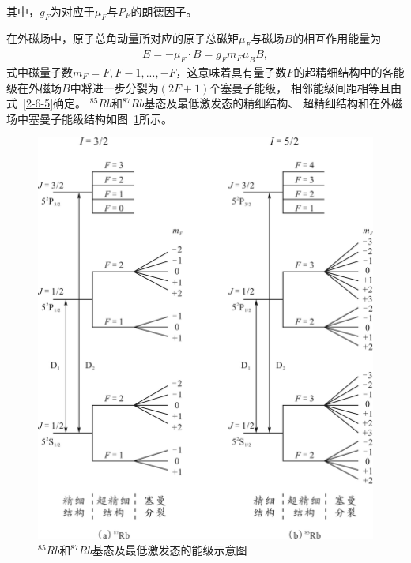 \documentclass[11pt,a4paper]{article}
\begin{document}
\begin{spacing}{1.3}
\begin{CJK*}{UTF8}{gbsn}
\begin{eqnarray}
\end{eqnarray}
其中，$g_F$为对应于$\mu_F$与$P_F$的朗德因子。\par
  在外磁场中，原子总角动量所对应的原子总磁矩$\mu_F$与磁场$B$的相互作用能量为
  \begin{eqnarray} \label{2-6-5}
  E= -\mu_F\cdot B=g_Fm_F\mu_BB,
\end{eqnarray}
式中磁量子数$m_F=F,F-1,...,-F$，这意味着具有量子数$F$的超精细结构中的各能级在外磁场$B$中将进一步分裂为$(2F+1)$个塞曼子能级，
相邻能级间距相等且由式~\eqref{2-6-5}确定。 $^{85}Rb$和$^{87}Rb$基态及最低激发态的精细结构、
超精细结构和在外磁场中塞曼子能级结构如图~\ref{fig2-6-1}所示。
\begin{figure}[H]
\centering
\includegraphics[width=.6\textwidth]{fig2-6-1}
\caption{$^{85}Rb$和$^{87}Rb$基态及最低激发态的能级示意图}
\label{fig2-6-1}
\end{figure} 


\end{CJK*}
\end{spacing}
\end{document}
